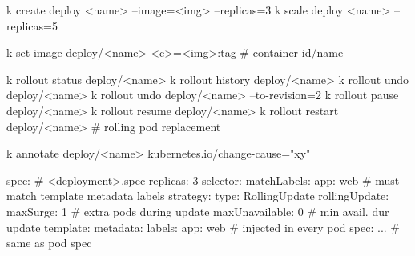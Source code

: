 
\begin{cheatcodebashbold}
k create deploy <name> --image=<img> --replicas=3
k scale deploy <name> --replicas=5
\end{cheatcodebashbold}


\begin{cheatcodebashbold}
k set image deploy/<name> <c>=<img>:tag # container id/name
\end{cheatcodebashbold}

\begin{cheatcodebashbold}
k rollout status  deploy/<name>
k rollout history deploy/<name>
k rollout undo    deploy/<name>
k rollout undo    deploy/<name> --to-revision=2
k rollout pause   deploy/<name>
k rollout resume  deploy/<name>
k rollout restart deploy/<name>  # rolling pod replacement
\end{cheatcodebashbold}

\begin{cheatcodebashbold}
k annotate deploy/<name> kubernetes.io/change-cause="xy"
\end{cheatcodebashbold}


\begin{cheatcodebashbold}
spec:                    # <deployment>.spec
  replicas: 3
  selector: {matchLabels: {app: web}} # must match template metadata labels
  strategy:
    type: RollingUpdate
    rollingUpdate:
      maxSurge: 1        # extra pods during update
      maxUnavailable: 0  # min avail. dur update
  template:
    metadata: {labels: {app: web}} # injected in every pod
    spec: ...            # same as pod spec
\end{cheatcodebashbold}




